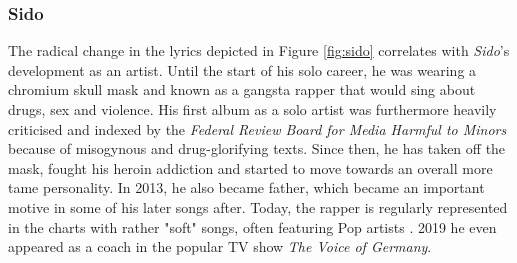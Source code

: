 \documentclass[conference]{IEEEtran}
\begin{document}
\subsubsection{Sido}
The radical change in the lyrics depicted in Figure \ref{fig:sido} correlates with \textit{Sido}'s development as an artist. Until the start of his solo career, he was wearing a chromium skull mask and known as a gangsta rapper that would sing about drugs, sex and violence. His first album as a solo artist was furthermore heavily criticised and indexed \cite{urteil} by the \textit{Federal Review Board for Media Harmful to Minors} \cite{bpjm} because of misogynous and drug-glorifying texts. Since then, he has taken off the mask, fought his heroin addiction and started to move towards an overall more tame personality. In 2013, he also became father, which became an important motive in some of his later songs after. Today, the rapper is regularly represented in the charts with rather "soft" songs, often featuring Pop artists \cite{sido_charts}. 2019 he even appeared as a coach in the popular TV show \textit{The Voice of Germany}.
\end{document}
